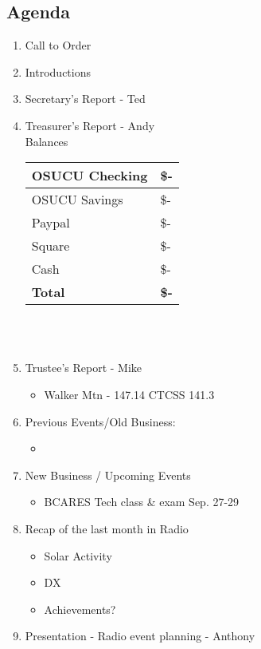 \documentclass[letter,11pt]{extarticle}
\begin{document}
	\subsection*{Agenda}
	\begin{enumerate}
		\item Call to Order
		\item Introductions
		\item Secretary's Report - Ted
		\item Treasurer's Report - Andy \\
				Balances 
			\begin{tabular}{|l|l|} \hline
				OSUCU Checking & \$- \\ \hline
				OSUCU Savings & \$- \\ \hline
				Paypal & \$- \\ \hline
				Square & \$- \\ \hline
				Cash & \$- \\ \hline
				\textbf{Total} & \textbf{\$-} \\ \hline
			\end{tabular} \\ \\
		\item Trustee's Report - Mike
			\begin{itemize}
				\item Walker Mtn - 147.14 CTCSS 141.3
			\end{itemize}
		\item Previous Events/Old Business:
		\begin{itemize}
			\item 	
		\end{itemize}
			
		\item  New Business / Upcoming Events
			\begin{itemize}
				\item BCARES Tech class \& exam Sep. 27-29
			\end{itemize}
		\item Recap of the last month in Radio
			\begin{itemize}
				\item Solar Activity
				\item DX
				\item Achievements?
			\end{itemize}
		\item  Presentation - Radio event planning - Anthony

	\end{enumerate}
\end{document}
